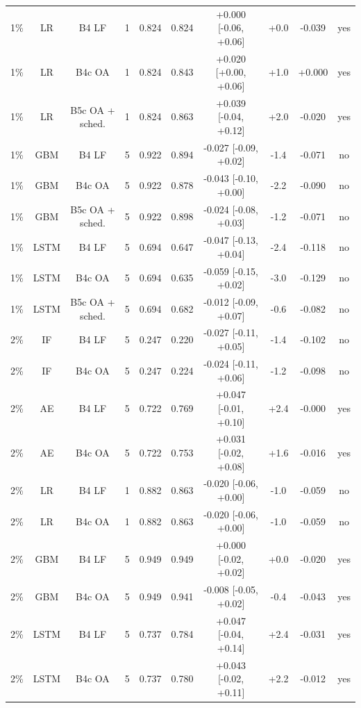 \documentclass[10pt,onecolumn,letterpaper]{article}
\begin{document}
\begin{table}[!t]
{\begin{tabular}{lccccccccc}
1\% & LR & B4 LF & 1 & 0.824 & 0.824 & +0.000 [-0.06, +0.06] & +0.0 & -0.039 & yes \\
1\% & LR & B4c OA & 1 & 0.824 & 0.843 & +0.020 [+0.00, +0.06] & +1.0 & +0.000 & yes \\
1\% & LR & B5c OA + sched. & 1 & 0.824 & 0.863 & +0.039 [-0.04, +0.12] & +2.0 & -0.020 & yes \\
1\% & GBM & B4 LF & 5 & 0.922 & 0.894 & -0.027 [-0.09, +0.02] & -1.4 & -0.071 & no \\
1\% & GBM & B4c OA & 5 & 0.922 & 0.878 & -0.043 [-0.10, +0.00] & -2.2 & -0.090 & no \\
1\% & GBM & B5c OA + sched. & 5 & 0.922 & 0.898 & -0.024 [-0.08, +0.03] & -1.2 & -0.071 & no \\
1\% & LSTM & B4 LF & 5 & 0.694 & 0.647 & -0.047 [-0.13, +0.04] & -2.4 & -0.118 & no \\
1\% & LSTM & B4c OA & 5 & 0.694 & 0.635 & -0.059 [-0.15, +0.02] & -3.0 & -0.129 & no \\
1\% & LSTM & B5c OA + sched. & 5 & 0.694 & 0.682 & -0.012 [-0.09, +0.07] & -0.6 & -0.082 & no \\
2\% & IF & B4 LF & 5 & 0.247 & 0.220 & -0.027 [-0.11, +0.05] & -1.4 & -0.102 & no \\
2\% & IF & B4c OA & 5 & 0.247 & 0.224 & -0.024 [-0.11, +0.06] & -1.2 & -0.098 & no \\
2\% & AE & B4 LF & 5 & 0.722 & 0.769 & +0.047 [-0.01, +0.10] & +2.4 & -0.000 & yes \\
2\% & AE & B4c OA & 5 & 0.722 & 0.753 & +0.031 [-0.02, +0.08] & +1.6 & -0.016 & yes \\
2\% & LR & B4 LF & 1 & 0.882 & 0.863 & -0.020 [-0.06, +0.00] & -1.0 & -0.059 & no \\
2\% & LR & B4c OA & 1 & 0.882 & 0.863 & -0.020 [-0.06, +0.00] & -1.0 & -0.059 & no \\
2\% & GBM & B4 LF & 5 & 0.949 & 0.949 & +0.000 [-0.02, +0.02] & +0.0 & -0.020 & yes \\
2\% & GBM & B4c OA & 5 & 0.949 & 0.941 & -0.008 [-0.05, +0.02] & -0.4 & -0.043 & yes \\
2\% & LSTM & B4 LF & 5 & 0.737 & 0.784 & +0.047 [-0.04, +0.14] & +2.4 & -0.031 & yes \\
2\% & LSTM & B4c OA & 5 & 0.737 & 0.780 & +0.043 [-0.02, +0.11] & +2.2 & -0.012 & yes \\
\bottomrule
\end{tabular}}
\end{table}
\end{document}
